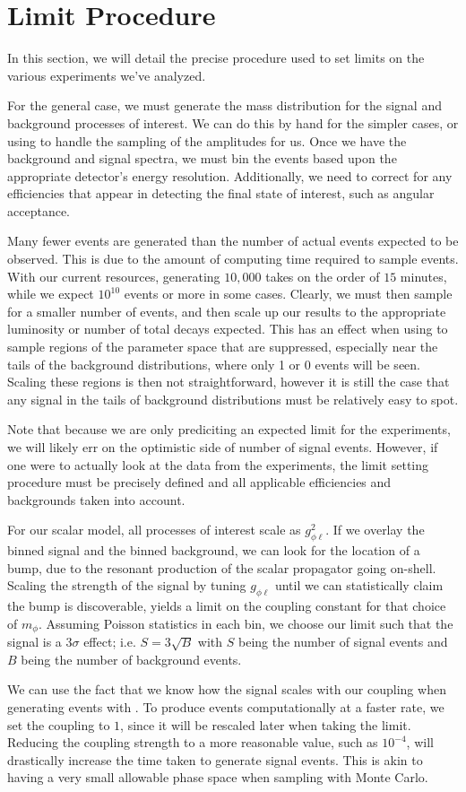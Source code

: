 \section{Limit Procedure}
\label{sec:limit_procedure}
In this section, we will detail the precise procedure used to set limits on the various experiments we've analyzed.

For the general case, we must generate the mass distribution for the signal and background processes of interest.
We can do this by hand for the simpler cases, or using \madgraph to handle the sampling of the amplitudes for us.
Once we have the background and signal spectra, we must bin the events based upon the appropriate detector's energy resolution.
Additionally, we need to correct for any efficiencies that appear in detecting the final state of interest, such as angular acceptance.

Many fewer events are generated than the number of actual events expected to be observed.
This is due to the amount of computing time required to sample events.
With our current resources, generating $10,000$ takes on the order of $15$ minutes, while we expect $10^{10}$ events or more in some cases.
Clearly, we must then sample for a smaller number of events, and then scale up our results to the appropriate luminosity or number of total decays expected.
This has an effect when using \madgraph to sample regions of the parameter space that are suppressed, especially near the tails of the background distributions, where only 1 or 0 events will be seen.
Scaling these regions is then not straightforward, however it is still the case that any signal in the tails of background distributions must be relatively easy to spot.

Note that because we are only prediciting an expected limit for the experiments, we will likely err on the optimistic side of number of signal events.
However, if one were to actually look at the data from the experiments, the limit setting procedure must be precisely defined and all applicable efficiencies and backgrounds taken into account.

For our scalar model, all processes of interest scale as $g_{\phi\ell}^2$.
If we overlay the binned signal and the binned background, we can look for the location of a bump, due to the resonant production of the scalar propagator going on-shell.
Scaling the strength of the signal by tuning $g_{\phi\ell}$ until we can statistically claim the bump is discoverable, yields a limit on the coupling constant for that choice of $m_\phi$.
Assuming Poisson statistics in each bin, we choose our limit such that the signal is a $3\sigma$ effect; i.e. $S = 3\sqrt{B}$ with $S$ being the number of signal events and $B$ being the number of background events.

We can use the fact that we know how the signal scales with our coupling when generating events with \madgraph.
To produce events computationally at a faster rate, we set the coupling to $1$, since it will be rescaled later when taking the limit.
Reducing the coupling strength to a more reasonable value, such as $10^{-4}$, will drastically increase the time taken to generate signal events.
This is akin to having a very small allowable phase space when sampling with Monte Carlo.

